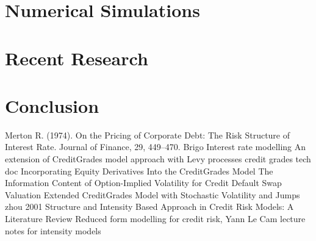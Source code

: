 \documentclass[11t,a4paper]{article}
\begin{document}
\section{Numerical Simulations}
\section{Recent Research}
\section{Conclusion}
\newpage

\begin{thebibliography}{1}
Merton R. (1974).  On the Pricing of Corporate Debt: The Risk Structure of Interest Rate. Journal of Finance, 29, 449–470.
Brigo Interest rate modelling
An extension of CreditGrades model approach with Levy processes
credit grades tech doc
Incorporating Equity Derivatives Into the CreditGrades Model
The Information Content of Option-Implied Volatility for Credit Default Swap Valuation
Extended CreditGrades Model with Stochastic Volatility and Jumps
zhou 2001
Structure and Intensity Based Approach in Credit Risk Models: A Literature Review
Reduced form modelling for credit risk, Yann Le Cam
lecture notes for intensity models
\end{thebibliography}
\end{document}
